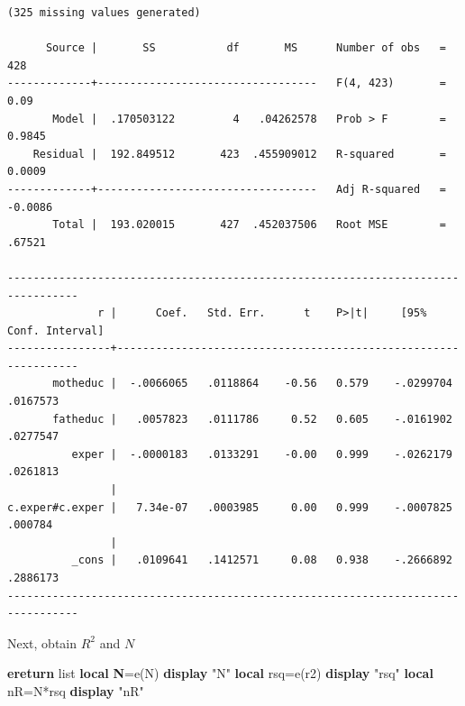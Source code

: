 \documentclass[
]{book}
\newenvironment{Shaded}{\begin{snugshade}}{\end{snugshade}}
\newcommand{\KeywordTok}[1]{\textcolor[rgb]{0.13,0.29,0.53}{\textbf{#1}}}
\newcommand{\NormalTok}[1]{#1}
\newcommand{\OtherTok}[1]{\textcolor[rgb]{0.56,0.35,0.01}{#1}}
\newcommand{\StringTok}[1]{\textcolor[rgb]{0.31,0.60,0.02}{#1}}
\begin{document}
\begin{verbatim}
(325 missing values generated)

      Source |       SS           df       MS      Number of obs   =       428
-------------+----------------------------------   F(4, 423)       =      0.09
       Model |  .170503122         4   .04262578   Prob > F        =    0.9845
    Residual |  192.849512       423  .455909012   R-squared       =    0.0009
-------------+----------------------------------   Adj R-squared   =   -0.0086
       Total |  193.020015       427  .452037506   Root MSE        =    .67521

---------------------------------------------------------------------------------
              r |      Coef.   Std. Err.      t    P>|t|     [95% Conf. Interval]
----------------+----------------------------------------------------------------
       motheduc |  -.0066065   .0118864    -0.56   0.579    -.0299704    .0167573
       fatheduc |   .0057823   .0111786     0.52   0.605    -.0161902    .0277547
          exper |  -.0000183   .0133291    -0.00   0.999    -.0262179    .0261813
                |
c.exper#c.exper |   7.34e-07   .0003985     0.00   0.999    -.0007825     .000784
                |
          _cons |   .0109641   .1412571     0.08   0.938    -.2666892    .2886173
---------------------------------------------------------------------------------
\end{verbatim}

Next, obtain \(R^2\) and \(N\)

\begin{Shaded}
\begin{Highlighting}[]
\KeywordTok{ereturn} \OtherTok{list}
\KeywordTok{local} \KeywordTok{N}\NormalTok{=}\OtherTok{\textasciigrave{}e(N)\textquotesingle{}}
\KeywordTok{display} \StringTok{"\textasciigrave{}N\textquotesingle{}"}
\KeywordTok{local}\NormalTok{ rsq=}\OtherTok{\textasciigrave{}e(r2)\textquotesingle{}}
\KeywordTok{display} \StringTok{"\textasciigrave{}rsq\textquotesingle{}"}
\KeywordTok{local}\NormalTok{ nR=}\OtherTok{\textasciigrave{}N\textquotesingle{}}\NormalTok{*}\OtherTok{\textasciigrave{}rsq\textquotesingle{}}
\KeywordTok{display} \StringTok{"\textasciigrave{}nR\textquotesingle{}"}
\end{Highlighting}
\end{Shaded}
\end{document}

